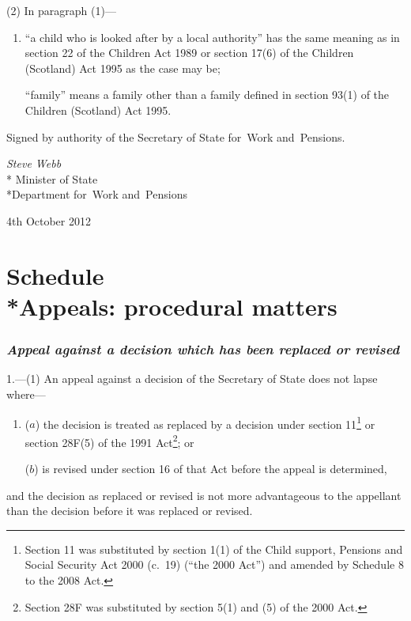 \documentclass[12pt,a4paper]{article}
\begin{document}
(2) In paragraph (1)—
\begin{enumerate}\item[]
“a child who is looked after by a local authority” has the same meaning as in section 22 of the Children Act 1989 or section 17(6) of the Children (Scotland) Act 1995 as the case may be;

“family” means a family other than a family defined in section 93(1) of the Children (Scotland) Act 1995. 
\end{enumerate}

\bigskip

\pagebreak[3]

Signed 
by authority of the 
Secretary of State for~Work and~Pensions.

{\raggedleft
\emph{Steve Webb}\\*
Minister
of State\\*Department 
for~Work and~Pensions

}

4th October 2012

\small

\part[Schedule --- Appeals: procedural matters]{Schedule\\*Appeals: procedural matters}

\section*{\itshape Appeal against a decision which has been replaced or revised}

1.---(1)  An appeal against a decision of the Secretary of State does not lapse where—
\begin{enumerate}\item[]
($a$) the decision is treated as replaced by a decision under section 11\footnote{Section 11 was substituted by section 1(1) of the Child support, Pensions and Social Security Act 2000 (c.~19) (“the 2000 Act”) and amended by Schedule 8 to the 2008 Act.} or section 28F(5) of the 1991 Act\footnote{Section 28F was substituted by section 5(1) and (5) of the 2000 Act.}; or

($b$) is revised under section 16 of that Act before the appeal is determined,
\end{enumerate}
and the decision as replaced or revised is not more advantageous to the appellant than the decision before it was replaced or revised.
\end{document}
